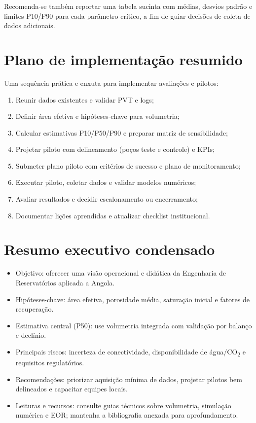 \documentclass[
  12pt,
  a4paper,
  oneside,
  brazilian,
  sumario=tradicional
]{abntex2}
\begin{document}
Recomenda-se também reportar uma tabela sucinta com médias, desvios padrão e limites P10/P90 para cada parâmetro crítico, a fim de guiar decisões de coleta de dados adicionais.
\chapter{Plano de implementação resumido}
Uma sequência prática e enxuta para implementar avaliações e pilotos:
\begin{enumerate}
  \item Reunir dados existentes e validar PVT e logs;
  \item Definir área efetiva e hipóteses-chave para volumetria;
  \item Calcular estimativas P10/P50/P90 e preparar matriz de sensibilidade;
  \item Projetar piloto com delineamento (poços teste e controle) e KPIs;
  \item Submeter plano piloto com critérios de sucesso e plano de monitoramento;
  \item Executar piloto, coletar dados e validar modelos numéricos;
  \item Avaliar resultados e decidir escalonamento ou encerramento;
  \item Documentar lições aprendidas e atualizar checklist institucional.
\end{enumerate}

\chapter{Resumo executivo condensado}
\begin{itemize}
  \item Objetivo: oferecer uma visão operacional e didática da Engenharia de Reservatórios aplicada a Angola.
  \item Hipóteses-chave: área efetiva, porosidade média, saturação inicial e fatores de recuperação.
  \item Estimativa central (P50): use volumetria integrada com validação por balanço e declínio.
  \item Principais riscos: incerteza de conectividade, disponibilidade de água/CO\textsubscript{2} e requisitos regulatórios.
  \item Recomendações: priorizar aquisição mínima de dados, projetar pilotos bem delineados e capacitar equipes locais.
  \item Leituras e recursos: consulte guias técnicos sobre volumetria, simulação numérica e EOR; mantenha a bibliografia anexada para aprofundamento.
\end{itemize}
\end{document}
